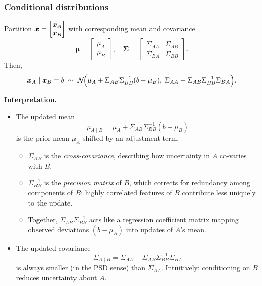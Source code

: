 \documentclass[11pt]{article}
\begin{document}
\subsubsection{Conditional distributions}
Partition $\bm{x} = \begin{bmatrix} \bm{x}_A \\ \bm{x}_B \end{bmatrix}$ with corresponding mean and covariance
\[
\bm{\mu} = \begin{bmatrix}\mu_A \\ \mu_B\end{bmatrix}, \quad
\bm{\Sigma} = \begin{bmatrix}
\Sigma_{AA} & \Sigma_{AB} \\
\Sigma_{BA} & \Sigma_{BB}
\end{bmatrix}.
\]
Then,
\[
\bm{x}_A \mid \bm{x}_B = b \;\sim\; \mathcal{N}\!\Big(\mu_A + \Sigma_{AB}\Sigma_{BB}^{-1}(b-\mu_B), \;\Sigma_{AA} - \Sigma_{AB}\Sigma_{BB}^{-1}\Sigma_{BA}\Big).
\]

\begin{note}
\textbf{Interpretation.}  

\begin{itemize}
    \item The updated mean 
    \[
    \mu_{A \mid B} = \mu_A + \Sigma_{AB}\Sigma_{BB}^{-1}(b - \mu_B)
    \]
    is the prior mean $\mu_A$ shifted by an adjustment term.  

    \begin{itemize}
        \item $\Sigma_{AB}$ is the \emph{cross-covariance}, describing how uncertainty in $A$ co-varies with $B$.  
        \item $\Sigma_{BB}^{-1}$ is the \emph{precision matrix} of $B$, which corrects for redundancy among components of $B$: highly correlated features of $B$ contribute less uniquely to the update.  
        \item Together, $\Sigma_{AB}\Sigma_{BB}^{-1}$ acts like a regression coefficient matrix mapping observed deviations $(b-\mu_B)$ into updates of $A$'s mean.  
    \end{itemize}

    \item The updated covariance
    \[
    \Sigma_{A \mid B} = \Sigma_{AA} - \Sigma_{AB}\Sigma_{BB}^{-1}\Sigma_{BA}
    \]
    is always smaller (in the PSD sense) than $\Sigma_{AA}$.  
    Intuitively: conditioning on $B$ reduces uncertainty about $A$.
\end{itemize}
\end{note}
\end{document}
